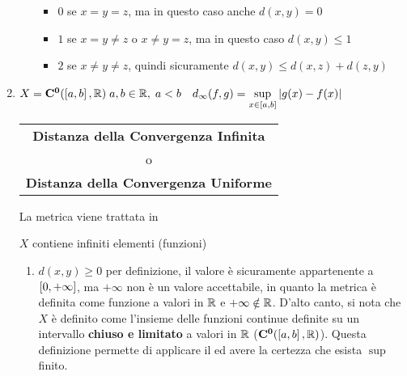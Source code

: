\begin{example}
\begin{enumerate}
\begin{enumerate}[label=\arabic*.]
					\begin{itemize}
						\item $0$ se $x = y = z$, ma in questo caso anche $d(x,y) = 0$
						\item $1$ se $x = y \neq z$ o $x \neq y = z$, ma in questo caso $d(x,y) \leq 1$
						\item $2$ se $x \neq y \neq z$, quindi sicuramente $d(x,y) \leq d(x,z) + d(z,y)$
					\end{itemize}
			\end{enumerate}
		\item $X=\mathbf{C^{0}}(\left[a,b\right],\mathbb{R})\;a,b\in\mathbb{R},\;a<b \quad d_\infty(f,g) = \sup\limits_{x\in\left[a,b\right]}\left|g(x)-f(x)\right|$ \hfill
			{\footnotesize
				\begin{tabular}{c}
					\textbf{Distanza della Convergenza Infinita}\\[-1ex]
					o\\[-1ex]
					\textbf{Distanza della Convergenza Uniforme}
				\end{tabular}
			}\label{ex:dim_dist_conv_unif}
			\begin{note}
				La metrica viene trattata in 
			\end{note}
			\begin{note}
				$X$ contiene infiniti elementi (funzioni)
			\end{note}
			\begin{center}
			\end{center}
			\begin{enumerate}[label=\arabic*.]
				\item $d(x,y) \geq 0$ per definizione, il valore è sicuramente appartenente a $\left[0,+\infty\right]$, ma $+\infty$ non è un valore accettabile, in quanto la metrica è definita come funzione a valori in $\mathbb{R}$ e $+\infty \notin \mathbb{R}$. D'alto canto, si nota che $X$ è definito come l'insieme delle funzioni continue definite su un intervallo \textbf{chiuso e limitato} a valori in $\mathbb{R}$ ($\mathbf{C^{0}}(\left[a,b\right],\mathbb{R})$). Questa definizione permette di applicare il  ed avere la certezza che esista $\sup$ finito.

\end{enumerate}
\end{enumerate}
\end{example}
